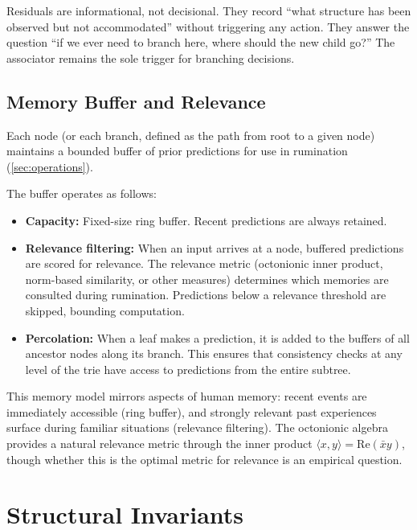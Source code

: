 \documentclass[11pt,a4paper]{article}
\theoremstyle{definition}
\theoremstyle{remark}
\begin{document}
Residuals are informational, not decisional. They record ``what structure has been observed but not accommodated'' without triggering any action. They answer the question ``if we ever need to branch here, where should the new child go?'' The associator remains the sole trigger for branching decisions.

\subsection{Memory Buffer and Relevance}
\label{sec:memory}

Each node (or each branch, defined as the path from root to a given node) maintains a bounded buffer of prior predictions for use in rumination (\cref{sec:operations}).

The buffer operates as follows:
\begin{itemize}[nosep]
  \item \textbf{Capacity:} Fixed-size ring buffer. Recent predictions are always retained.
  \item \textbf{Relevance filtering:} When an input arrives at a node, buffered predictions are scored for relevance. The relevance metric (octonionic inner product, norm-based similarity, or other measures) determines which memories are consulted during rumination. Predictions below a relevance threshold are skipped, bounding computation.
  \item \textbf{Percolation:} When a leaf makes a prediction, it is added to the buffers of all ancestor nodes along its branch. This ensures that consistency checks at any level of the trie have access to predictions from the entire subtree.
\end{itemize}

This memory model mirrors aspects of human memory: recent events are immediately accessible (ring buffer), and strongly relevant past experiences surface during familiar situations (relevance filtering). The octonionic algebra provides a natural relevance metric through the inner product $\langle x, y \rangle = \text{Re}(\bar{x}y)$, though whether this is the optimal metric for relevance is an empirical question.

\section{Structural Invariants}
\label{sec:invariants}
\end{document}
